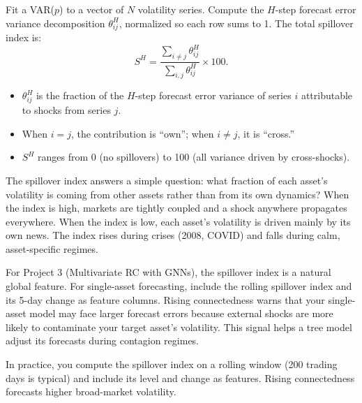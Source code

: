 \begin{definition}
Fit a VAR($p$) to a vector of $N$ volatility series. Compute the $H$-step forecast error variance decomposition $\theta_{ij}^H$, normalized so each row sums to 1.
The total spillover index is:
\begin{equation}\label{eq:spillover}
S^H = \frac{\sum_{i \neq j} \theta_{ij}^H}{\sum_{i,j} \theta_{ij}^H} \times 100.
\end{equation}
\begin{itemize}[nosep]
  \item $\theta_{ij}^H$ is the fraction of the $H$-step forecast error variance of series $i$ attributable to shocks from series $j$.
  \item When $i = j$, the contribution is ``own''; when $i \neq j$, it is ``cross.''
  \item $S^H$ ranges from 0 (no spillovers) to 100 (all variance driven by cross-shocks).
\end{itemize}
\end{definition}

\begin{intuition}
The spillover index answers a simple question: what fraction of each asset's volatility is coming from other assets rather than from its own dynamics? When the index is high, markets are tightly coupled and a shock anywhere propagates everywhere. When the index is low, each asset's volatility is driven mainly by its own news. The index rises during crises (2008, COVID) and falls during calm, asset-specific regimes.
\end{intuition}

\begin{projectconnection}
For Project 3 (Multivariate RC with GNNs), the spillover index is a natural global feature. For single-asset forecasting, include the rolling spillover index and its 5-day change as feature columns. Rising connectedness warns that your single-asset model may face larger forecast errors because external shocks are more likely to contaminate your target asset's volatility. This signal helps a tree model adjust its forecasts during contagion regimes.
\end{projectconnection}

In practice, you compute the spillover index on a rolling window (200 trading days is typical) and include its level and change as features.
Rising connectedness forecasts higher broad-market volatility.

